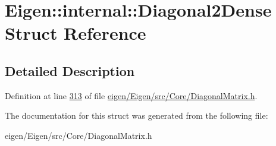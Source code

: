\hypertarget{struct_eigen_1_1internal_1_1_diagonal2_dense}{}\section{Eigen\+:\+:internal\+:\+:Diagonal2\+Dense Struct Reference}
\label{struct_eigen_1_1internal_1_1_diagonal2_dense}


\subsection{Detailed Description}


Definition at line \hyperlink{eigen_2_eigen_2src_2_core_2_diagonal_matrix_8h_source_l00313}{313} of file \hyperlink{eigen_2_eigen_2src_2_core_2_diagonal_matrix_8h_source}{eigen/\+Eigen/src/\+Core/\+Diagonal\+Matrix.\+h}.



The documentation for this struct was generated from the following file\+:\begin{DoxyCompactItemize}
\item 
eigen/\+Eigen/src/\+Core/\+Diagonal\+Matrix.\+h\end{DoxyCompactItemize}
